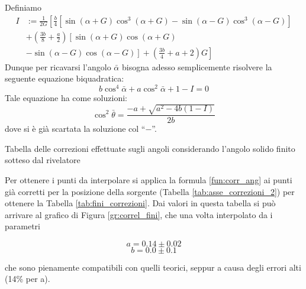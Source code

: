Definiamo
\begin{equation}
\begin{split}
	I & := \frac{1}{2G} \left[ \frac{b}{4}\left[ \sin \left( \alpha + G \right) \cos^3 \left( \alpha + G \right) - \sin \left( \alpha - G \right) \cos^3 \left( \alpha - G \right) \right] \right.\\
	&+ \left( \frac{3b}{8} + \frac{a}{2} \right)\left[ \sin \left( \alpha + G \right) \cos \left( \alpha + G \right) \right.\\
	&\left.\left. - \sin \left( \alpha - G \right) \cos \left( \alpha - G \right) \right] + \left( \frac{3b}{4} + a + 2 \right) G \right]
\end{split}
\end{equation}
Dunque per ricavarsi l'angolo $ \bar \alpha $ bisogna adesso semplicemente risolvere la seguente equazione biquadratica: 
\begin{equation}
	b \cos^4 \bar\alpha + a \cos ^ 2 \bar \alpha + 1 - I= 0
\end{equation}
Tale equazione ha come soluzioni:
\begin{equation}
	\cos^2 \bar \theta  = \frac{-a + \sqrt{a^2 - 4b(1 - I)}}{2b}
	\label{fun:corr_ang}
\end{equation}
dove si è già scartata la soluzione col ``$-$''.

\begin{table}[h]
	\centering
	
	\caption{Tabella delle correzioni effettuate sugli angoli considerando l'angolo solido finito sotteso dal rivelatore}
	\label{tab:fini_correzioni}
\end{table}

Per ottenere i punti da interpolare si applica la formula \ref{fun:corr_ang} ai punti già corretti per la posizione della sorgente (Tabella \ref{tab:asse_correzioni_2}) per ottenere la Tabella \ref{tab:fini_correzioni}. Dai valori in questa tabella si può arrivare al grafico di Figura \ref{gr:correl_fini}, che una volta interpolato da i parametri

$$a=0.14 \pm 0.02$$
$$b=0.0 \pm 0.1$$

che sono pienamente compatibili con quelli teorici, seppur a causa degli errori alti (14\% per a).





